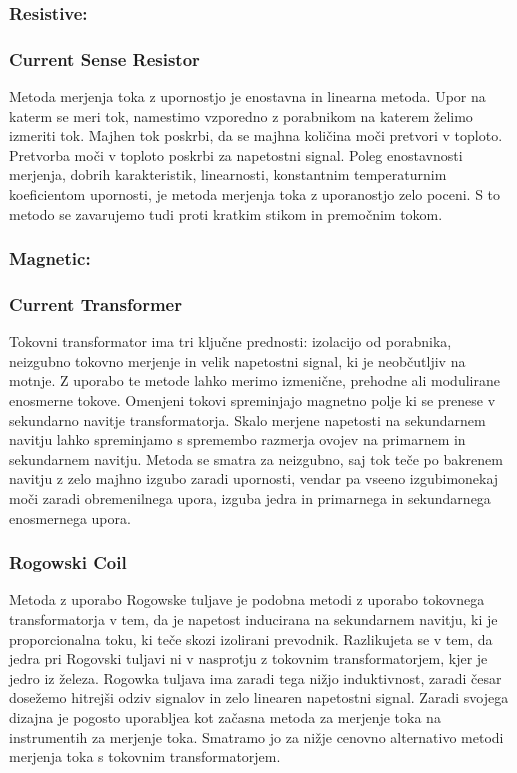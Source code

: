 \documentclass[12pt,a4paper,titlepage,openany]{report}
\begin{document}
\subsubsection{Resistive:}
\subsubsection{Current Sense Resistor}
Metoda merjenja toka z upornostjo je enostavna in linearna metoda. Upor na katerm se meri tok, namestimo vzporedno z porabnikom na katerem želimo izmeriti tok.
Majhen tok poskrbi, da se majhna količina moči pretvori v toploto. Pretvorba moči v toploto poskrbi za napetostni signal. Poleg enostavnosti merjenja, dobrih karakteristik, linearnosti, 
konstantnim temperaturnim koeficientom upornosti, je metoda merjenja toka z uporanostjo zelo poceni. S to metodo se zavarujemo tudi proti kratkim stikom in premočnim tokom.

\subsubsection{Magnetic:}
\subsubsection{Current Transformer}
Tokovni transformator ima tri ključne prednosti: izolacijo od porabnika, neizgubno tokovno merjenje in velik napetostni signal, ki je neobčutljiv na motnje. Z uporabo te metode lahko merimo izmenične, prehodne ali modulirane enosmerne tokove. Omenjeni tokovi spreminjajo magnetno polje ki se prenese v sekundarno navitje transformatorja. Skalo merjene napetosti na sekundarnem navitju lahko spreminjamo s spremembo razmerja ovojev na primarnem in sekundarnem navitju. Metoda se smatra za neizgubno, saj tok teče po bakrenem navitju z zelo majhno izgubo zaradi upornosti, vendar pa vseeno izgubimonekaj moči zaradi obremenilnega upora, izguba jedra in primarnega in sekundarnega enosmernega upora.

\subsubsection{Rogowski Coil}
Metoda z uporabo Rogowske tuljave je podobna metodi z uporabo tokovnega transformatorja v tem, da je napetost inducirana na sekundarnem navitju, ki je proporcionalna toku, ki teče skozi izolirani prevodnik. Razlikujeta se v tem, da jedra pri Rogovski tuljavi ni v nasprotju z tokovnim transformatorjem, kjer je jedro iz železa. Rogowka tuljava ima zaradi tega nižjo induktivnost, zaradi česar dosežemo hitrejši odziv signalov in zelo linearen napetostni signal. Zaradi svojega dizajna je pogosto uporabljea kot začasna metoda za merjenje toka na instrumentih za merjenje toka. Smatramo jo za nižje cenovno alternativo metodi merjenja toka s tokovnim transformatorjem.
\end{document}
